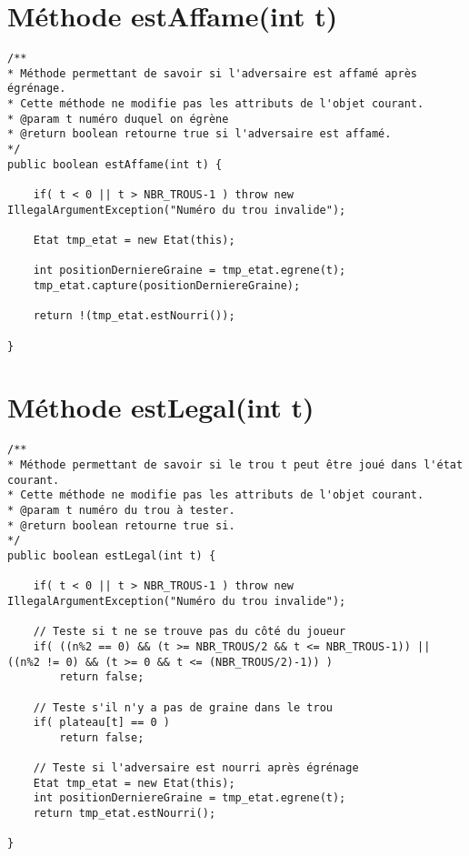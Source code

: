 \documentclass[11pt,a4paper]{report}
\begin{document}
\newpage

\section{Méthode estAffame(int t)}
\begin{lstlisting}
/**
* Méthode permettant de savoir si l'adversaire est affamé après égrénage.
* Cette méthode ne modifie pas les attributs de l'objet courant.
* @param t numéro duquel on égrène
* @return boolean retourne true si l'adversaire est affamé.
*/
public boolean estAffame(int t) {

    if( t < 0 || t > NBR_TROUS-1 ) throw new IllegalArgumentException("Numéro du trou invalide");
    
    Etat tmp_etat = new Etat(this);

    int positionDerniereGraine = tmp_etat.egrene(t);
    tmp_etat.capture(positionDerniereGraine);

    return !(tmp_etat.estNourri());

}
\end{lstlisting}

\section{Méthode estLegal(int t)}
\begin{lstlisting}
/**
* Méthode permettant de savoir si le trou t peut être joué dans l'état courant.
* Cette méthode ne modifie pas les attributs de l'objet courant.
* @param t numéro du trou à tester.
* @return boolean retourne true si.
*/
public boolean estLegal(int t) {

    if( t < 0 || t > NBR_TROUS-1 ) throw new IllegalArgumentException("Numéro du trou invalide");

    // Teste si t ne se trouve pas du côté du joueur
    if( ((n%2 == 0) && (t >= NBR_TROUS/2 && t <= NBR_TROUS-1)) || ((n%2 != 0) && (t >= 0 && t <= (NBR_TROUS/2)-1)) )
        return false;

    // Teste s'il n'y a pas de graine dans le trou
    if( plateau[t] == 0 )
        return false;

    // Teste si l'adversaire est nourri après égrénage
    Etat tmp_etat = new Etat(this);
    int positionDerniereGraine = tmp_etat.egrene(t);
    return tmp_etat.estNourri();
    
}
\end{lstlisting}

\newpage
\end{document}
